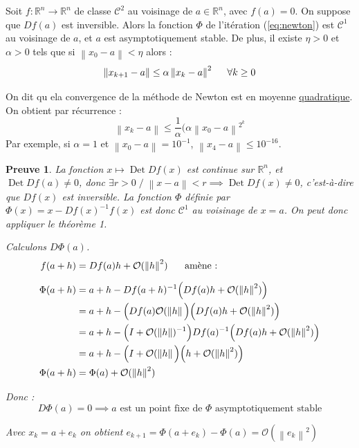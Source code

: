 \documentclass[a4paper,11pt]{article}
\newcommand{\R}{\mathbb{R}}
\newcommand{\gO}{\mathcal{O}}
\newcommand{\norm}[1]{\left\lVert#1\right\rVert}
\DeclareMathOperator{\Det}{Det}
\theoremstyle{plain} %
\newtheorem{preuve}{Preuve}
\begin{document}
    \begin{ftheo}
        Soit $f : \R^n \longrightarrow \R^n$ de classe $\mathcal{C}^2$ au voisinage de $a \in \R^n$, avec $f(a) = 0$.
        On suppose que $Df(a)$ est inversible. Alors la fonction $\Phi$ de l'itération
        (\ref{eq:newton}) est $\mathcal{C}^1$ au voisinage de $a$, et $a$ est asymptotiquement
        stable. De plus, il existe $\eta > 0$ et $\alpha > 0$ tels que si
        $\norm{x_0 - a} < \eta$ alors :
        \[
            \norm{x_{k+1} - a} \leq \alpha \norm{x_k - a}^2 \hspace{0.5cm} \forall k \geq 0
        \]
    \end{ftheo}

    \begin{remark}
        On dit qu ela convergence de la méthode de Newton est en moyenne \underline{quadratique}.
        On obtient par récurrence :
        \[
            \norm{x_k - a} \leq \frac{1}{\alpha}(\alpha \norm{x_0 - a}^{2^k}
        \]
        Par exemple, si $\alpha = 1$ et $\norm{x_0 - a} = 10^{-1}$, $\norm{x_4 - a} \leq 10^{-16}$.
    \end{remark}

    \begin{preuve}
        La fonction $x \longmapsto \Det Df(x)$ est continue sur $\R^n$, et $\Det Df(a) \ne 0$,
        donc $\exists r > 0 \; / \; \norm{x-a} < r \implies \Det Df(x) \ne 0$,
        c'est-à-dire que $Df(x)$ est inversible. La fonction $\Phi$ définie par
        $\Phi(x) = x - Df(x)^{-1} f(x)$ est donc $\mathcal{C}^1$ au voisinage de $x=a$.
        On peut donc appliquer le théorème 1.

        Calculons $D\Phi(a)$.
        \begin{align*}
            f(a+h) & = Df(a)h + \mathcal{O}(\norm{h}^2) \hspace{0.5cm} \text{ amène :} \\[6pt]
            \Phi(a+h) & = a + h - Df(a+h)^{-1} \Big(Df(a)h + \mathcal{O}(\norm{h}^2) \Big) \\
            & = a + h - \Big( Df(a) \gO(\norm{h} \Big) \Big( Df(a)h + \gO(\norm{h}^2) \Big) \\
            & = a + h - \Big( I + \gO(\norm{h})^{-1} \Big) Df(a)^{-1} \Big( Df(a)h + \gO(\norm{h}^2) \Big) \\
            & = a + h - \Big( I + \gO(\norm{h} \Big) \Big( h + \gO(\norm{h}^2) \Big) \\
            \Phi(a+h) & = \Phi(a) + \gO(\norm{h}^2)
        \end{align*}

        Donc :
        \[
            D\Phi(a) = 0 \implies \text{$a$ est un point fixe de $\Phi$ asymptotiquement stable}
        \]

        Avec $x_k = a + e_k$ on obtient $e_{k+1} = \Phi(a+e_k) - \Phi(a) = \gO(\norm{e_k}^2)$

    \end{preuve}
\end{document}
